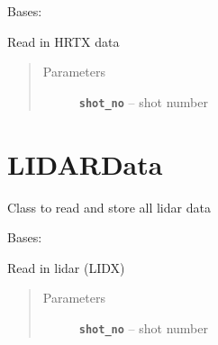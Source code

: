 \documentclass[letterpaper,10pt,english]{sphinxmanual}
\begin{document}
\begin{fulllineitems}
\label{hrts_data:hrts_data.HRTSData}
Bases: 

\begin{fulllineitems}
\label{hrts_data:hrts_data.HRTSData.read_data}
Read in HRTX data
\begin{quote}\begin{description}
\item[{Parameters}] \leavevmode
\textbf{\texttt{shot\_no}} -- shot number

\end{description}\end{quote}

\end{fulllineitems}


\end{fulllineitems}



\section{LIDARData}
\label{lidar_data:module-lidar_data}\label{lidar_data:lidardata}\label{lidar_data::doc}
Class to read and store all lidar data

\begin{fulllineitems}
\label{lidar_data:lidar_data.LIDARData}
Bases: 

\begin{fulllineitems}
\label{lidar_data:lidar_data.LIDARData.read_data}
Read in lidar (LIDX)
\begin{quote}\begin{description}
\item[{Parameters}] \leavevmode
\textbf{\texttt{shot\_no}} -- shot number

\end{description}\end{quote}

\end{fulllineitems}


\end{fulllineitems}
\end{document}

